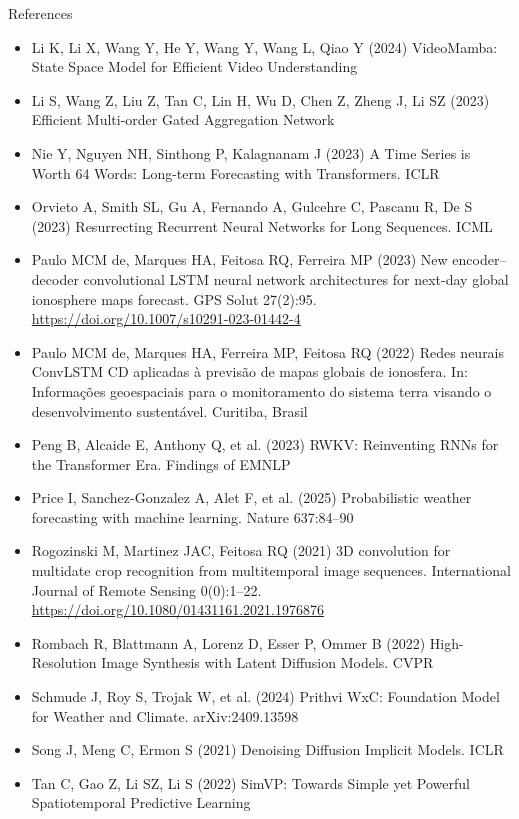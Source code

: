 \documentclass{beamer}
\begin{document}
\begin{frame}[allowframebreaks]{References}
\begin{itemize}
        \item[] Li K, Li X, Wang Y, He Y, Wang Y, Wang L, Qiao Y (2024) VideoMamba: State Space Model for Efficient Video Understanding
        \item[] Li S, Wang Z, Liu Z, Tan C, Lin H, Wu D, Chen Z, Zheng J, Li SZ (2023) Efficient Multi-order Gated Aggregation Network
        \item[] Nie Y, Nguyen NH, Sinthong P, Kalagnanam J (2023) A Time Series is Worth 64 Words: Long-term Forecasting with Transformers. ICLR
        \item[] Orvieto A, Smith SL, Gu A, Fernando A, Gulcehre C, Pascanu R, De S (2023) Resurrecting Recurrent Neural Networks for Long Sequences. ICML
        \item[] Paulo MCM de, Marques HA, Feitosa RQ, Ferreira MP (2023) New encoder--decoder convolutional LSTM neural network architectures for next-day global ionosphere maps forecast. GPS Solut 27(2):95. \url{https://doi.org/10.1007/s10291-023-01442-4}
        \item[] Paulo MCM de, Marques HA, Ferreira MP, Feitosa RQ (2022) Redes neurais ConvLSTM CD aplicadas à previsão de mapas globais de ionosfera. In: Informações geoespaciais para o monitoramento do sistema terra visando o desenvolvimento sustentável. Curitiba, Brasil
        \item[] Peng B, Alcaide E, Anthony Q, et al. (2023) RWKV: Reinventing RNNs for the Transformer Era. Findings of EMNLP
        \item[] Price I, Sanchez-Gonzalez A, Alet F, et al. (2025) Probabilistic weather forecasting with machine learning. Nature 637:84--90
        \item[] Rogozinski M, Martinez JAC, Feitosa RQ (2021) 3D convolution for multidate crop recognition from multitemporal image sequences. International Journal of Remote Sensing 0(0):1--22. \url{https://doi.org/10.1080/01431161.2021.1976876}
        \item[] Rombach R, Blattmann A, Lorenz D, Esser P, Ommer B (2022) High-Resolution Image Synthesis with Latent Diffusion Models. CVPR
        \item[] Schmude J, Roy S, Trojak W, et al. (2024) Prithvi WxC: Foundation Model for Weather and Climate. arXiv:2409.13598
        \item[] Song J, Meng C, Ermon S (2021) Denoising Diffusion Implicit Models. ICLR
        \item[] Tan C, Gao Z, Li SZ, Li S (2022) SimVP: Towards Simple yet Powerful Spatiotemporal Predictive Learning

\end{itemize}
\end{frame}
\end{document}
